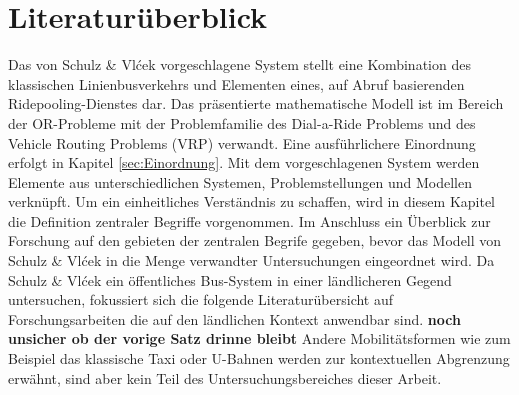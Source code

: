 
\chapter{Literaturüberblick}
\label{chapter:2}
Das von Schulz \& Vlćek vorgeschlagene System stellt eine Kombination des klassischen Linienbusverkehrs und Elementen eines, auf Abruf basierenden Ridepooling-Dienstes dar. Das präsentierte mathematische Modell ist im Bereich der OR-Probleme mit der Problemfamilie des Dial-a-Ride Problems und des Vehicle Routing Problems (VRP) verwandt. Eine ausführlichere Einordnung erfolgt in Kapitel \ref{sec:Einordnung}. Mit dem vorgeschlagenen System werden Elemente aus unterschiedlichen Systemen, Problemstellungen und Modellen verknüpft. Um ein einheitliches Verständnis zu schaffen, wird in diesem Kapitel die Definition zentraler Begriffe vorgenommen. Im Anschluss ein Überblick zur Forschung auf den gebieten der zentralen Begrife gegeben, bevor das Modell von Schulz \& Vlćek in die Menge verwandter Untersuchungen eingeordnet wird. Da Schulz \& Vlćek ein öffentliches Bus-System in einer ländlicheren Gegend untersuchen, fokussiert sich die folgende Literaturübersicht auf Forschungsarbeiten die auf den ländlichen Kontext anwendbar sind. \textbf{noch unsicher ob der vorige Satz drinne bleibt} Andere Mobilitätsformen wie zum Beispiel das klassische Taxi oder U-Bahnen werden zur kontextuellen Abgrenzung erwähnt, sind aber kein Teil des Untersuchungsbereiches dieser Arbeit.


